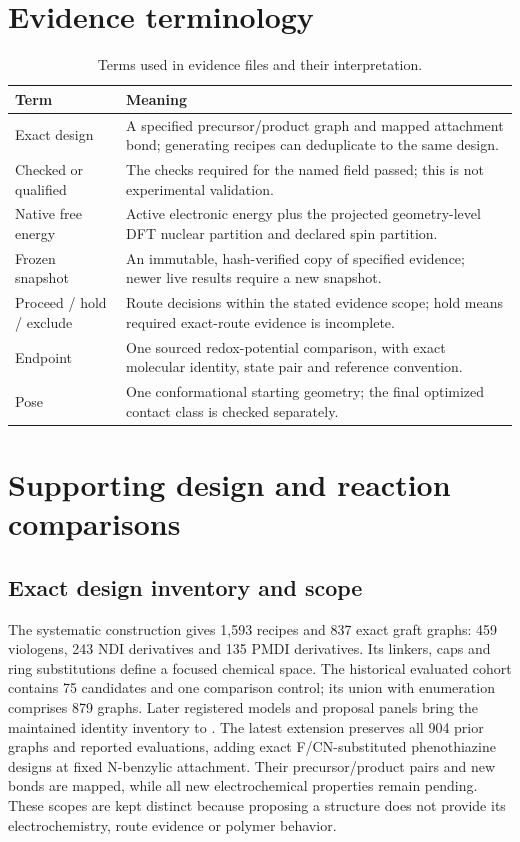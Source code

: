 \documentclass[11pt]{article}
\begin{document}
\section{Evidence terminology}
\begin{table}[H]\centering\small
\caption{Terms used in evidence files and their interpretation.}
\begin{tabular}{p{.24\linewidth}p{.67\linewidth}}\toprule
Term & Meaning\\\midrule
Exact design & A specified precursor/product graph and mapped attachment bond; generating recipes can deduplicate to the same design.\\
Checked or qualified & The checks required for the named field passed; this is not experimental validation.\\
Native free energy & Active electronic energy plus the projected geometry-level DFT nuclear partition and declared spin partition.\\
Frozen snapshot & An immutable, hash-verified copy of specified evidence; newer live results require a new snapshot.\\
Proceed / hold / exclude & Route decisions within the stated evidence scope; hold means required exact-route evidence is incomplete.\\
Endpoint & One sourced redox-potential comparison, with exact molecular identity, state pair and reference convention.\\
Pose & One conformational starting geometry; the final optimized contact class is checked separately.\\
\bottomrule\end{tabular}\end{table}

\section{Supporting design and reaction comparisons}
\subsection{Exact design inventory and scope}
The systematic construction gives 1,593 recipes and 837 exact graft graphs: 459 viologens, 243 NDI derivatives and 135 PMDI derivatives. Its linkers, caps and ring substitutions define a focused chemical space. The historical evaluated cohort contains 75 candidates and one comparison control; its union with enumeration comprises 879 graphs. Later registered models and proposal panels bring the maintained identity inventory to \UnifiedRegistryCount{}. The latest extension preserves all 904 prior graphs and reported evaluations, adding \NewDirectPTZDesigns{} exact F/CN-substituted phenothiazine designs at fixed N-benzylic attachment. Their precursor/product pairs and new bonds are mapped, while all new electrochemical properties remain pending. These scopes are kept distinct because proposing a structure does not provide its electrochemistry, route evidence or polymer behavior.
\end{document}
